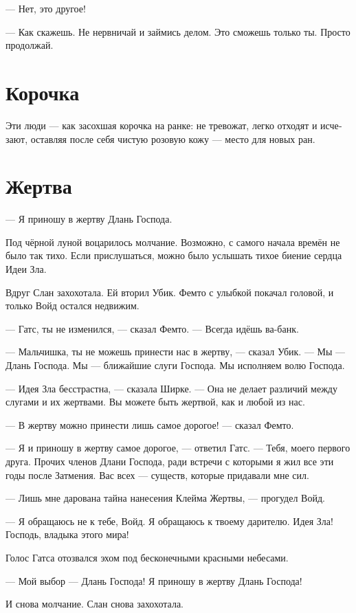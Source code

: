 \documentclass[a4paper,12pt,fleqn]{book}\usepackage{polyglossia}\setdefaultlanguage[babelshorthands=true]{russian}\setotherlanguage{english}\defaultfontfeatures{Ligatures=TeX,Mapping=tex-text}\usepackage{xcolor}\newcommand{\ml}[3]{#2}
\begin{document}
--- Нет, это другое!

--- Как скажешь.
Не нервничай и займись делом.
Это сможешь только ты.
Просто продолжай.

\section{Корочка}

Эти люди --- как засохшая корочка на ранке: не тревожат, легко отходят и исчезают, оставляя после себя чистую розовую кожу --- место для новых ран.

\section{Жертва}

--- Я приношу в жертву Длань Господа.

Под чёрной луной воцарилось молчание.
Возможно, с самого начала времён не было так тихо.
Если прислушаться, можно было услышать тихое биение сердца Идеи Зла.

Вдруг Слан захохотала.
Ей вторил Убик.
Фемто с улыбкой покачал головой, и только Войд остался недвижим.

--- Гатс, ты не изменился, --- сказал Фемто.
--- Всегда идёшь ва-банк.

--- Мальчишка, ты не можешь принести нас в жертву, --- сказал Убик.
--- Мы --- Длань Господа.
Мы --- ближайшие слуги Господа.
Мы исполняем волю Господа.

--- Идея Зла бесстрастна, --- сказала Ширке.
--- Она не делает различий между слугами и их жертвами.
Вы можете быть жертвой, как и любой из нас.

--- В жертву можно принести лишь самое дорогое! --- сказал Фемто.

--- Я и приношу в жертву самое дорогое, --- ответил Гатс.
--- Тебя, моего первого друга.
Прочих членов Длани Господа, ради встречи с которыми я жил все эти годы после Затмения.
Вас всех --- существ, которые придавали мне сил.

--- Лишь мне дарована тайна нанесения Клейма Жертвы, --- прогудел Войд.

--- Я обращаюсь не к тебе, Войд.
Я обращаюсь к твоему дарителю.
Идея Зла!
Господь, владыка этого мира!

Голос Гатса отозвался эхом под бесконечными красными небесами.

--- Мой выбор --- Длань Господа!
Я приношу в жертву Длань Господа!

И снова молчание.
Слан снова захохотала.
\end{document}
